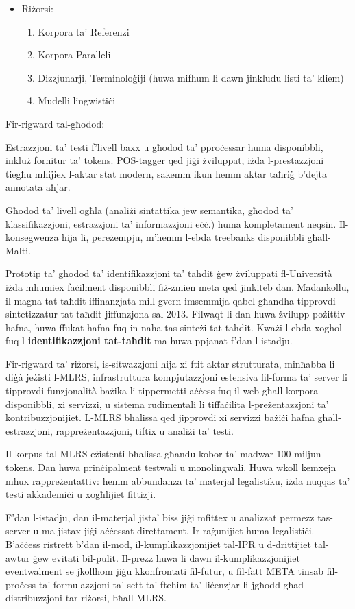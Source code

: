 \documentclass[]{../../metanetpaper}
\begin{document}
\begin{multicols}{2}
\begin{itemize}
\item Riżorsi: 
\begin{enumerate}
\item Korpora ta’ Referenzi 
\item Korpora Paralleli 
\item Dizzjunarji, Terminoloġiji (huwa mifhum li dawn jinkludu listi ta’ kliem) 
\item Mudelli lingwistiċi 
\end{enumerate}
\end{itemize}

Fir-rigward tal-għodod:

Estrazzjoni ta’ testi f’livell baxx u għodod ta’ pproċessar huma disponibbli, inkluż fornitur ta’ tokens. POS-tagger qed jiġi żviluppat, iżda l-prestazzjoni tiegħu mhijiex l-aktar stat modern, sakemm ikun hemm aktar taħriġ b’dejta annotata aħjar.

Għodod ta’ livell ogħla (analiżi sintattika jew semantika, għodod ta’ klassifikazzjoni, estrazzjoni ta’ informazzjoni eċċ.) huma kompletament neqsin. Il-konsegwenza hija li, pereżempju, m’hemm l-ebda treebanks disponibbli għall-Malti.

Prototip ta’ għodod ta’ identifikazzjoni ta’ taħdit ġew żviluppati fl-Università iżda mhumiex faċilment disponibbli fiż-żmien meta qed jinkiteb dan. Madankollu, il-magna tat-taħdit iffinanzjata mill-gvern imsemmija qabel għandha tipprovdi sintetizzatur tat-taħdit jiffunzjona sal-2013. Filwaqt li dan huwa żvilupp pożittiv ħafna, huwa ffukat ħafna fuq in-naħa tas-sinteżi tat-taħdit. Kważi l-ebda xogħol fuq l-\textbf{identifikazzjoni tat-taħdit} ma huwa ppjanat f'dan l-istadju.

Fir-rigward ta’ riżorsi, is-sitwazzjoni hija xi ftit aktar strutturata, minħabba li diġà jeżisti l-MLRS, infrastruttura kompjutazzjoni estensiva fil-forma ta’ server li tipprovdi funzjonalità bażika li tippermetti aċċess fuq il-web għall-korpora disponibbli, xi servizzi, u sistema rudimentali li tiffaċilita l-preżentazzjoni ta’ kontribuzzjonijiet. L-MLRS bħalissa qed jipprovdi xi servizzi bażiċi ħafna għall-estrazzjoni, rappreżentazzjoni, tiftix u analiżi ta’ testi.

Il-korpus tal-MLRS eżistenti bħalissa għandu kobor ta’ madwar 100 miljun tokens. Dan huwa prinċipalment testwali u monolingwali. Huwa wkoll kemxejn mhux rappreżentattiv: hemm abbundanza ta’ materjal legalistiku, iżda nuqqas ta’ testi akkademiċi u xogħlijiet fittizji.

F'dan l-istadju, dan il-materjal jista’ biss jiġi mfittex u analizzat permezz tas-server u ma jistax jiġi aċċessat direttament. Ir-raġunijiet huma legalistiċi. B’aċċess ristrett b’dan il-mod, il-kumplikazzjonijiet tal-IPR u d-drittijiet tal-awtur ġew evitati bil-pulit. Il-prezz huwa li dawn il-kumplikazzjonijiet eventwalment se jkollhom jiġu kkonfrontati fil-futur, u fil-fatt META tinsab fil-proċess ta’ formulazzjoni ta’ sett ta’ ftehim ta’ liċenzjar li jgħodd għad-distribuzzjoni tar-riżorsi, bħall-MLRS.



\end{multicols}
\end{document}

